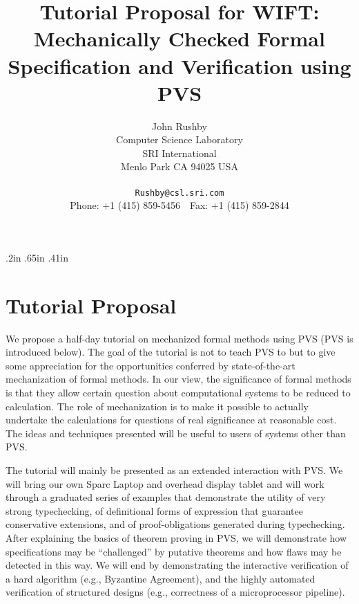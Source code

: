 \topmargin .2in
\textwidth 5.5in
\textheight 7.75in
\oddsidemargin .65in
\evensidemargin .41in
\sloppy
\title{\bf Tutorial Proposal for WIFT:\\
Mechanically Checked Formal Specification and Verification using PVS}
\author{John Rushby\\
Computer Science Laboratory\\
SRI International\\
Menlo Park CA 94025 USA
\\ \mbox{ }\\
{\tt Rushby@csl.sri.com}
\\Phone: +1 (415) 859-5456\ \ Fax: +1 (415) 859-2844
}

\date{}

\maketitle

\section{Tutorial Proposal}

We propose a half-day tutorial on mechanized formal methods using PVS
(PVS is introduced below).  The goal of the tutorial is not to teach
PVS to but to give some appreciation for the opportunities conferred
by state-of-the-art mechanization of formal methods.  In our view, the
significance of formal methods is that they allow certain question
about computational systems to be reduced to calculation.  The
role of mechanization is to make it possible to actually undertake the
calculations for questions of real significance at reasonable cost.
The ideas and techniques presented will be useful to users of systems
other than PVS.

The tutorial will mainly be presented as an extended interaction with
PVS\@.  We will bring our own Sparc Laptop and overhead display tablet
and will work through a graduated series of examples that demonstrate
the utility of very strong typechecking, of definitional forms of
expression that guarantee conservative extensions, and of
proof-obligations generated during typechecking.  After explaining the
basics of theorem proving in PVS, we will demonstrate how
specifications may be ``challenged'' by putative theorems and how
flaws may be detected in this way.  We will end by demonstrating the
interactive verification of a hard algorithm (e.g., Byzantine
Agreement), and the highly automated verification of structured
designs (e.g., correctness of a microprocessor pipeline).

